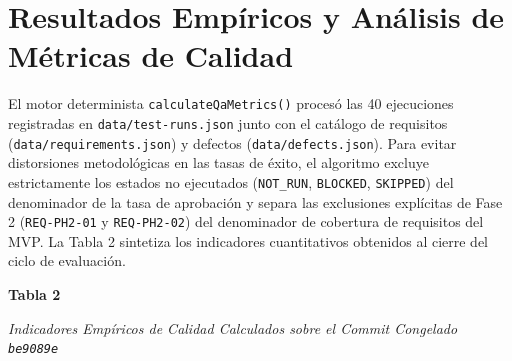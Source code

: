 \documentclass[stu,12pt,a4paper]{apa7}
\begin{document}
\section{Resultados Empíricos y Análisis de Métricas de Calidad}\label{resultados-empuxedricos-y-anuxe1lisis-de-muxe9tricas-de-calidad}

El motor determinista \texttt{calculateQaMetrics\allowbreak{}(\allowbreak{})\allowbreak{}} procesó las 40 ejecuciones registradas en \texttt{data/\allowbreak{}test-{}\allowbreak{}runs.\allowbreak{}json} junto con el catálogo de requisitos (\texttt{data/\allowbreak{}requirements.\allowbreak{}json}) y defectos (\texttt{data/\allowbreak{}defects.\allowbreak{}json}). Para evitar distorsiones metodológicas en las tasas de éxito, el algoritmo excluye estrictamente los estados no ejecutados (\texttt{NOT\_\allowbreak{}RUN}, \texttt{BLOCKED}, \texttt{SKIPPED}) del denominador de la tasa de aprobación y separa las exclusiones explícitas de Fase 2 (\texttt{REQ-{}\allowbreak{}PH2-{}\allowbreak{}01} y \texttt{REQ-{}\allowbreak{}PH2-{}\allowbreak{}02}) del denominador de cobertura de requisitos del MVP. La Tabla 2 sintetiza los indicadores cuantitativos obtenidos al cierre del ciclo de evaluación.

\noindent\textbf{Tabla 2}\par\nopagebreak\noindent\textit{Indicadores Empíricos de Calidad Calculados sobre el Commit Congelado \texttt{be9089e}}\par\nopagebreak\vspace{0.3em}

\begingroup\singlespacing\footnotesize\setlength{\parskip}{0pt}
\end{document}
